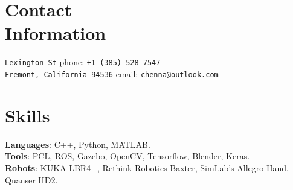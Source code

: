 \documentclass[letterpaper, margin, line, 10.5pt]{resume}
\begin{document}
\author{Kautilya Chenna}

\begin{resume}

    
    \section{\myheadingstyle Contact \\ Information}

    \texttt{Lexington St}                            \hfill phone: \texttt{\href{tel:13855287547}{+1 (385) 528-7547}}          \vspace{0mm}\\\vspace{0mm}%
    \texttt{Fremont, California 94536}                          \hfill email: \texttt{\href{mailto:chenna@outlook.com}{chenna@outlook.com}}       %


    
	\sectionseperator
	\section{\myheadingstyle Skills} 
	
	\textbf{Languages}: C++, Python, MATLAB. \\[1mm]
	\textbf{Tools}: PCL, ROS, Gazebo, OpenCV, Tensorflow, Blender, Keras. \\[1mm]
	\textbf{Robots}: KUKA LBR4+, Rethink Robotics Baxter, SimLab's Allegro Hand, Quanser HD2.%


    
    \sectionseperator

\end{resume}
\end{document}
